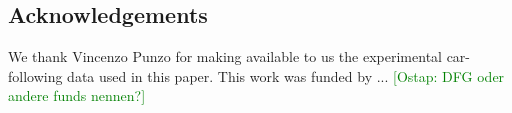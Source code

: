 \documentclass[review]{elsarticle}
\providecommand{\green}[1]{\textcolor{green}{#1}}
\providecommand{\martinc}[1]{\green{[#1]}} %
\providecommand{\3}{{\ss}}
\begin{document}
	
		\subsection*{Acknowledgements}
		We thank Vincenzo Punzo for making available to us the experimental
		car-following data used in this paper. This work was funded by ...
	\martinc{Ostap: DFG oder andere funds nennen?}
	
	
	
	
	
	
	
\end{document}
